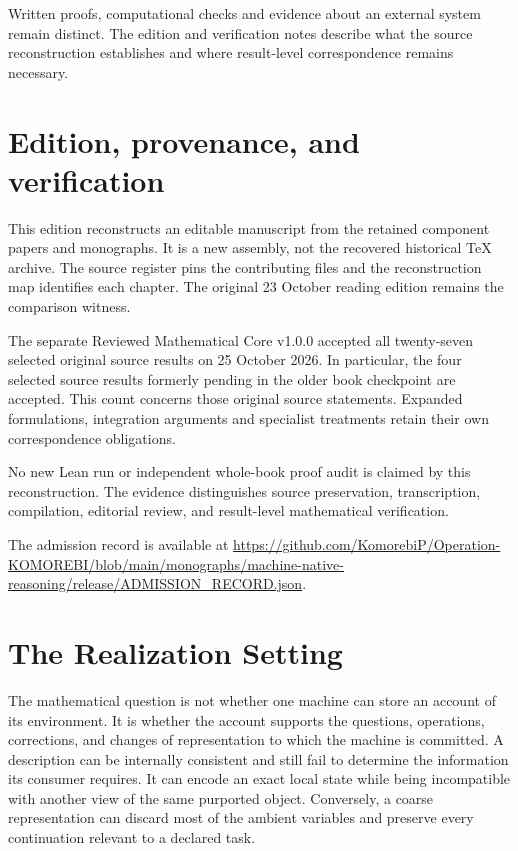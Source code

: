 \documentclass[11pt,oneside,openany]{book}
\numberwithin{equation}{section}
\begin{document}
Written proofs, computational checks and evidence about an external system remain distinct. The edition and verification notes describe what the source reconstruction establishes and where result-level correspondence remains necessary.
\chapter{Edition, provenance, and verification}
This edition reconstructs an editable manuscript from the retained component papers and monographs. It is a new assembly, not the recovered historical TeX archive. The source register pins the contributing files and the reconstruction map identifies each chapter. The original 23 October reading edition remains the comparison witness.

The separate Reviewed Mathematical Core v1.0.0 accepted all twenty-seven selected original source results on 25 October 2026. In particular, the four selected source results formerly pending in the older book checkpoint are accepted. This count concerns those original source statements. Expanded formulations, integration arguments and specialist treatments retain their own correspondence obligations.

No new Lean run or independent whole-book proof audit is claimed by this reconstruction. The evidence distinguishes source preservation, transcription, compilation, editorial review, and result-level mathematical verification.

The admission record is available at \url{https://github.com/KomorebiP/Operation-KOMOREBI/blob/main/monographs/machine-native-reasoning/release/ADMISSION_RECORD.json}.
\tableofcontents
\renewcommand{\theCoretheorem}{R.\arabic{Coretheorem}}
\chapter*{The Realization Setting}


The mathematical question is not whether one machine can store an account of its environment. It is whether the account supports the questions, operations, corrections, and changes of representation to which the machine is committed. A description can be internally consistent and still fail to determine the information its consumer requires. It can encode an exact local state while being incompatible with another view of the same purported object. Conversely, a coarse representation can discard most of the ambient variables and preserve every continuation relevant to a declared task.
\end{document}
